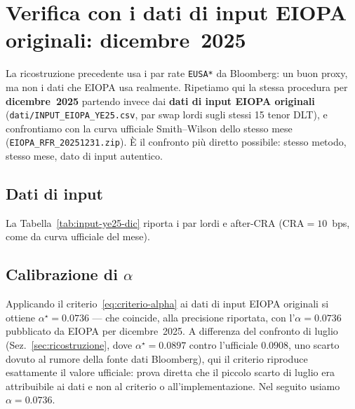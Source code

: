 \documentclass[11pt,a4paper]{article}
\theoremstyle{plain}
\theoremstyle{definition}
\theoremstyle{remark}
\newcommand{\CRA}{\ensuremath{\mathrm{CRA}}}
\begin{document}
\section{Verifica con i dati di input EIOPA originali: dicembre~2025}
\label{sec:verifica-ye25}

La ricostruzione precedente usa i par rate \texttt{EUSA*} da Bloomberg: un buon proxy, ma
non i dati che EIOPA usa realmente. Ripetiamo qui la stessa procedura per
\textbf{dicembre~2025} partendo invece dai \textbf{dati di input EIOPA originali}
(\texttt{dati/INPUT\_EIOPA\_YE25.csv}, par swap lordi sugli stessi 15 tenor DLT), e
confrontiamo con la curva ufficiale Smith--Wilson dello stesso mese
(\texttt{EIOPA\_RFR\_20251231.zip}). \`E il confronto pi\`u diretto possibile: stesso metodo,
stesso mese, dato di input autentico.

\subsection{Dati di input}

La Tabella~\ref{tab:input-ye25-dic} riporta i par lordi e after-CRA ($\CRA=10$~bps, come da
curva ufficiale del mese).



\subsection{Calibrazione di $\alpha$}

Applicando il criterio~\eqref{eq:criterio-alpha} ai dati di input EIOPA originali si ottiene
$\alpha^\star = 0.0736$ --- che coincide, alla precisione riportata, con l'$\alpha=0.0736$
pubblicato da EIOPA per dicembre~2025. A differenza del confronto di luglio
(Sez.~\ref{sec:ricostruzione}, dove $\alpha^\star=0.0897$ contro l'ufficiale $0.0908$, uno
scarto dovuto al rumore della fonte dati Bloomberg), qui il criterio riproduce esattamente il
valore ufficiale: prova diretta che il piccolo scarto di luglio era attribuibile ai dati e
non al criterio o all'implementazione. Nel seguito usiamo $\alpha=0.0736$.
\end{document}
